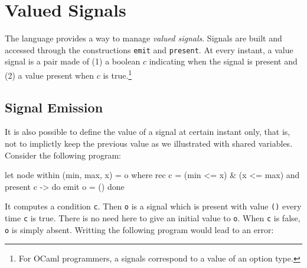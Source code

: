 \documentclass[11pt,titlepage,twoside]{report}
\newcommand{\ocaml}{{\sf OCaml}}
\begin{document}


\section{Valued Signals}
\label{signals}
The language provides a way to manage {\em valued signals}. Signals
are built and accessed through the constructions \verb-emit- and
\verb-present-.  At every instant, a value signal is a pair made of (1) a boolean
$c$ indicating when the signal is present and (2) a value present when $c$ is
true.\footnote{For \ocaml{} programmers, a signals correspond to a value
of an option type.}
 
\subsection{Signal Emission}
It is also possible to define the value of a signal at certain instant only,
that is, not to implictly keep the previous value as we illustrated with
shared variables. %
Consider the following program:
\begin{runverbatim}[withresult]
let node within (min, max, x) = o where
  rec c = (min <= x) & (x <= max)
  and present c -> do emit o = () done
\end{runverbatim}
It computes a condition \verb-c-. Then \verb-o- is a signal
which is present with value \verb-()- every time \verb-c- is
true. There is no need here to give an initial value to \verb-o-. When \verb-c- is
false, \verb-o- is simply absent. Writting the following program would lead to
an error:
\end{document}
